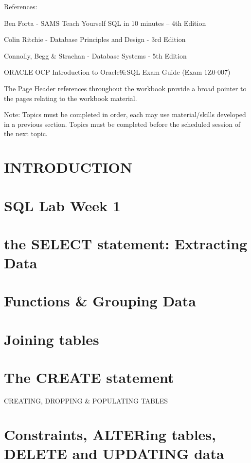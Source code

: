 \documentclass{report}
\begin{document}
\begin{flushleft}
{\begin{center}
\begin{minipage}{6.525cm}
\end{minipage}
\end{center}
\clearpage
References:

Ben Forta - SAMS Teach Yourself SQL in 10 minutes -- 4th Edition

Colin Ritchie - Database Principles and Design - 3rd Edition

Connolly, Begg \& Strachan - Database Systems  {}-  5th Edition

ORACLE OCP Introduction to Oracle9i:SQL Exam Guide (Exam 1Z0-007) 

The Page Header references throughout the workbook provide a broad pointer to the pages relating to the workbook material.

Note: Topics must be completed in order, each may use material/skills developed in a previous section.  Topics must be completed before the scheduled session of the next topic.

\clearpage
\chapter{INTRODUCTION}


\chapter{SQL Lab Week 1}


\chapter{the SELECT statement: Extracting Data}


\chapter{Functions \& Grouping Data}


\chapter{Joining tables}


\chapter{The CREATE statement}
CREATING, DROPPING \& POPULATING TABLES


\chapter{Constraints, ALTERing tables, DELETE and UPDATING data}


}
\end{flushleft}
\end{document}
